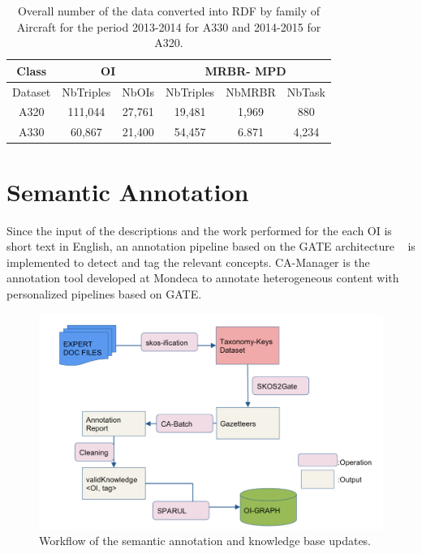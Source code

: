 \documentclass[runningheads,a4paper]{{llncs}}
\begin{document}
\begin{table}[!htb]
\centering
\begin{tabular}{|c|c|c||c|c|c|}

\hline 
Class & \multicolumn{2}{c||}{OI} & \multicolumn{3}{c|}{MRBR- MPD} \\ 
\hline 
Dataset & NbTriples & NbOIs & NbTriples & NbMRBR & NbTask \\ 
\hline 
A320 & 111,044 & 27,761 & 19,481 & 1,969 & 880 \\ 
\hline 
A330 & 60,867 & 21,400 & 54,457 & 6.871 & 4,234 \\ 
\hline  

\end{tabular} 
\caption{Overall number of the data converted into RDF by family of Aircraft for the period 2013-2014 for A330 and 2014-2015 for A320.}
\label{tab:graphdata}
\end{table}

\section{Semantic Annotation}
\label{sec:annotation}

Since the input of the descriptions and the work performed for the each OI is short text in English, an annotation pipeline based on the GATE architecture ~\cite{gatearch,kenter2005gate} is implemented to detect and tag the relevant concepts. CA-Manager is the annotation tool developed at Mondeca to annotate heterogeneous content with personalized pipelines based on GATE. 

\begin{figure}[!htb]
\centering
\includegraphics[scale=0.4]{img/archi-oi.png} 
\caption{Workflow of the semantic annotation and knowledge base updates.}
\label{figarchi}
\end{figure}
\end{document}
